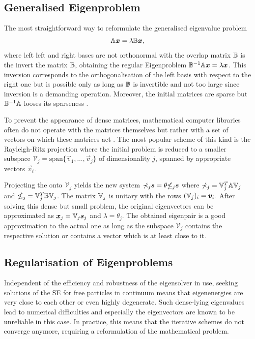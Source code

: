 \subsection{Generalised Eigenproblem}
\label{ch:GenEV}
The most straightforward way to reformulate the generalised eigenvalue problem
\begin{equation} \label{eq:Gep}
\mathbb{A}\bm{x}=\lambda\mathbb{B}\bm{x},
\end{equation}
where left left and right bases are not orthonormal with the overlap matrix $\mathbb{B}$ is the invert the matrix $\mathbb{B}$, obtaining the regular Eigenproblem $\mathbb{B}^{-1}\mathbb{A}\bm{x}=\lambda\bm{x}$.
This inversion corresponds to the orthogonalisation of the left basis with respect to the right one but is possible only as long as $\mathbb{B}$ is invertible and not too large since inversion is a demanding operation.
Moreover, the initial matrices are sparse but $\mathbb{B}^{-1}\mathbb{A}$ looses its sparseness \cite{slepcManual}.

To prevent the appearance of dense matrices, mathematical computer libraries often do not operate with the matrices themselves but rather with a set of vectors on which these matrices act \cite{slepcManual}.
The most popular scheme of this kind is the Rayleigh-Ritz projection where the initial problem is reduced to a smaller subspace $\mathcal{V}_j=\text{span} \{\vec{v}_1,\hdots,\vec{v}_j\}$ of dimensionality $j$, spanned by appropriate vectors $\vec{v}_i$.

Projecting the  onto $\mathcal{V}_j$ yields the new system $\mathbb{\Sigma}_j \bm{s}=\theta\mathbb{\Theta}_j\bm{s}$ where $\mathbb{\Sigma}_j=\mathbb{V}_j^T\mathbb{A}\mathbb{V}_j$ and $\mathbb{\Theta}_j=\mathbb{V}_j^T\mathbb{B}\mathbb{V}_j$.
The matrix $\mathbb{V}_j$ is unitary with the rows $(\mathbb{V}_j)_i=\bm{v}_i$.
After solving this dense but small problem, the original eigenvectors can be approximated as $\bm{x}_j=\mathbb{V}_j\bm{s}_j$ and $\lambda=\theta_j$.
The obtained eigenpair is a good approximation to the actual one as long as the subspace $\mathcal{V}_j$ contains the respective solution or contains a vector which is at least close to it.

\subsection{Regularisation of Eigenproblems}
\label{ch:regular}
Independent of the efficiency and robustness of the eigensolver in use, seeking solutions of the SE for free particles in continuum means that eigenenergies are very close to each other or even highly degenerate.
Such dense-lying eigenvalues lead to numerical difficulties and especially the eigenvectors are known to be unreliable in this case.
In practice, this means that the iterative schemes do not converge anymore, requiring a reformulation of the mathematical problem.

